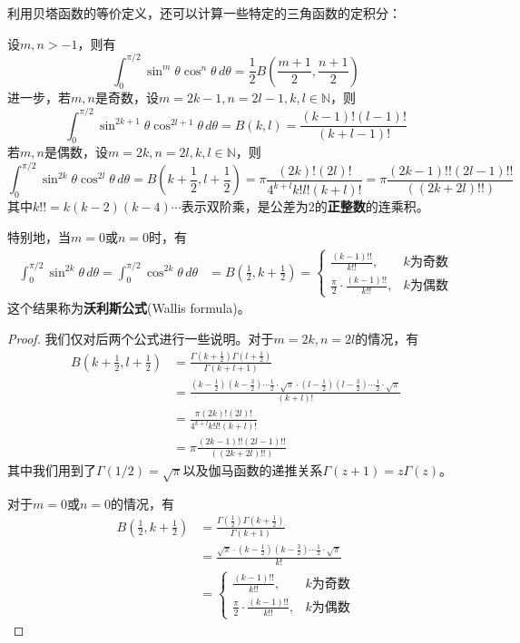 \documentclass{ctexbook}
\begin{document}
利用贝塔函数的等价定义，还可以计算一些特定的三角函数的定积分：
\begin{proposition}
    设$m,n>-1$，则有
    \[\int_{0}^{\pi/2}\sin^m\theta\cos^n\theta\,d\theta=\frac{1}{2}B\left(\frac{m+1}{2},\frac{n+1}{2}\right)\]
    进一步，若$m,n$是奇数，设$m=2k-1,n=2l-1,k,l\in\mathbb{N}$，则
    \[\int_{0}^{\pi/2}\sin^{2k+1}\theta\cos^{2l+1}\theta\,d\theta=B(k,l)=\frac{(k-1)!(l-1)!}{(k+l-1)!}\]
    若$m,n$是偶数，设$m=2k,n=2l,k,l\in\mathbb{N}$，则
    \[\int_{0}^{\pi/2}\sin^{2k}\theta\cos^{2l}\theta\,d\theta=B\left(k+\frac{1}{2},l+\frac{1}{2}\right)=\pi\frac{(2k)!(2l)!}{4^{k+l}k!l!(k+l)!}=\pi\frac{(2k-1)!!(2l-1)!!}{((2k+2l)!!)}\]
    其中$k!!=k(k-2)(k-4)\cdots$表示双阶乘，是公差为2的\textbf{正整数}的连乘积。

    特别地，当$m=0$或$n=0$时，有
    \begin{align*}
        \int_{0}^{\pi/2}\sin^{2k}\theta\,d\theta=\int_{0}^{\pi/2}\cos^{2k}\theta\,d\theta&=B\left(\frac{1}{2},k+\frac{1}{2}\right)=\begin{cases}
            \frac{(k-1)!!}{k!!}, & k\text{为奇数} \\
            \frac{\pi}{2}\cdot\frac{(k-1)!!}{k!!}, & k\text{为偶数}
        \end{cases}
    \end{align*}
    这个结果称为\textbf{沃利斯公式}(Wallis formula)。
\end{proposition}
\begin{proof}
    我们仅对后两个公式进行一些说明。对于$m=2k,n=2l$的情况，有
    \begin{align*}
        B\left(k+\frac{1}{2},l+\frac{1}{2}\right)&=\frac{\Gamma \left(k+\frac{1}{2}\right)\Gamma \left(l+\frac{1}{2}\right)}{\Gamma \left(k+l+1\right)}\\
        &=\frac{\left(k-\frac{1}{2}\right)\left(k-\frac{3}{2}\right)\cdots\frac{1}{2}\cdot\sqrt{\pi}\cdot\left(l-\frac{1}{2}\right)\left(l-\frac{3}{2}\right)\cdots\frac{1}{2}\cdot\sqrt{\pi}}{(k+l)!}\\
        &=\frac{\pi(2k)!(2l)!}{4^{k+l}k!l!(k+l)!}\\
        &=\pi\frac{(2k-1)!!(2l-1)!!}{((2k+2l)!!)}
    \end{align*}
    其中我们用到了$\Gamma(1/2)=\sqrt{\pi}$以及伽马函数的递推关系$\Gamma(z+1)=z\Gamma(z)$。
    
    对于$m=0$或$n=0$的情况，有
    \begin{align*}
        B\left(\frac{1}{2},k+\frac{1}{2}\right)&=\frac{\Gamma \left(\frac{1}{2}\right)\Gamma \left(k+\frac{1}{2}\right)}{\Gamma \left(k+1\right)}\\
                                             &=\frac{\sqrt{\pi}\cdot\left(k-\frac{1}{2}\right)\left(k-\frac{3}{2}\right)\cdots\frac{1}{2}\cdot\sqrt{\pi}}{k!}\\
                                             &=\begin{cases}
            \frac{(k-1)!!}{k!!}, & k\text{为奇数} \\
            \frac{\pi}{2}\cdot\frac{(k-1)!!}{k!!}, & k\text{为偶数}
        \end{cases}
    \end{align*}
\end{proof}
\end{document}
